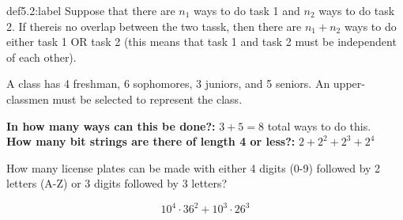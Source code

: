 \begin{definition}{def5.2:label}
    Suppose that there are $n_1$ ways to do task 1 and $n_2$ ways to do task 2. If thereis no overlap between the two tassk, then there are $n_1+n_2$ ways to do either task 1 OR task 2 (this means that task 1 and task 2 must be independent of each other).
\end{definition}

\begin{problem}
    A class has 4 freshman, 6 sophomores, 3 juniors, and 5 seniors. An upper-classmen must be selected to represent the class. 
    
    \textbf{In how many ways can this be done?:} $3 + 5 = 8$ total ways to do this.\\

    \textbf{How many bit strings are there of length 4 or less?:} $2 + 2^2 + 2^3 + 2^4$\\
\end{problem}

\begin{problem}
    How many license plates can be made with either 4 digits (0-9) followed by 2 letters (A-Z) or 3 digits followed by 3 letters?

    $$
    10^4 \cdot 36^2 + 10^3 \cdot 26^3
    $$
\end{problem}
